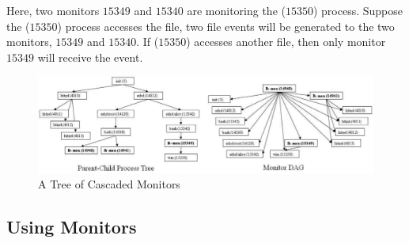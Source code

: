 Here, two monitors $15349$ and $15340$ are monitoring the
($15350$) process. 
Suppose the  ($15350$) 
process accesses the  file, 
two file events will be generated to the two monitors, $15349$ and $15340$.
If  ($15350$) accesses another file, then only
monitor $15349$ will receive the event.

\begin{figure}
\includegraphics[width=1.0\textwidth]{lbox/mon-both}
\caption{A Tree of Cascaded Monitors}
\label{fig:lbox-mon-tree}
\end{figure}





\subsection{Using Monitors}

